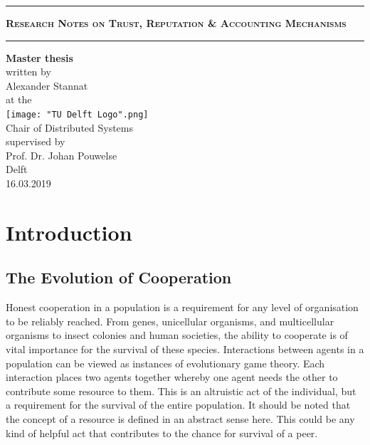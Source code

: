 \documentclass[11pt,a4paper]{article}
\theoremstyle{definition}
\theoremstyle{theorem}
\theoremstyle{proposition}
\theoremstyle{corollary}
\theoremstyle{lemma}
\theoremstyle{example}
\theoremstyle{remark}
\begin{document}
\bigskip\noindent
\hrule\vspace{1em}
\begin{center}{\bf{\Large \textsc{Research Notes on Trust, Reputation \& Accounting Mechanisms}}}\end{center}\vspace{1em}
\hrule
\bigskip\bigskip\bigskip\noindent 
\begin{center}
{\bf Master thesis} \vspace{1em}\\ written by \vspace{1em}\\ Alexander Stannat \\ \bigskip at the \vspace{3em}\\
\texttt{[image: "TU Delft Logo".png]}  \\
\bigskip\bigskip Chair of Distributed Systems \\ \bigskip supervised by \vspace{1em}\\ Prof. Dr. Johan Pouwelse \vspace{2em}\\ Delft \\ 16.03.2019
\end{center}

\newpage

\setcounter{tocdepth}{2}
\tableofcontents
\newpage
{}
\section{Introduction}
\label{sec:Introduction}
\subsection{The Evolution of Cooperation}
\label{subsec:The Evolution of Cooperation}
Honest cooperation in a population is a requirement for any level of organisation to be reliably reached. From genes, unicellular organisms, and multicellular organisms to insect colonies and human societies, the ability to cooperate is of vital importance for the survival of these species. Interactions between agents in a population can be viewed as instances of evolutionary game theory. Each interaction places two agents together whereby one agent needs the other to contribute some resource to them. This is an altruistic act of the individual, but a requirement for the survival of the entire population. It should be noted that the concept of a resource is defined in an abstract sense here. This could be any kind of helpful act that contributes to the chance for survival of a peer.\vspace{1em}\\
\end{document}
